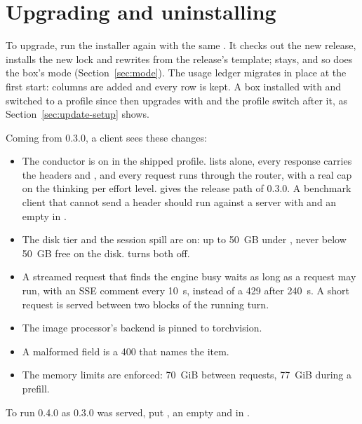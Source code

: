 \section{Upgrading and uninstalling}

To upgrade, run the installer again with the same . It checks out the new release, installs the new lock and rewrites  from the release's template;  stays, and so does the box's mode (Section~\ref{sec:mode}). The usage ledger migrates in place at the first start: columns are added and every row is kept. A box installed with  and switched to a profile since then upgrades with  and the profile switch after it, as Section~\ref{sec:update-setup} shows.

Coming from 0.3.0, a client sees these changes:

\begin{itemize}
\item The conductor is on in the shipped profile.  lists  alone, every response carries the headers  and , and every request runs through the router, with a real cap on the thinking per effort level.  gives the release path of 0.3.0. A benchmark client that cannot send a header should run against a server with  and an empty  in .
\item The disk tier and the session spill are on: up to 50~GB under , never below 50~GB free on the disk.  turns both off.
\item A streamed request that finds the engine busy waits as long as a request may run, with an SSE comment every 10~s, instead of a 429 after 240~s. A short request is served between two blocks of the running turn.
\item The image processor's backend is pinned to torchvision.
\item A malformed  field is a 400 that names the item.
\item The memory limits are enforced: 70~GiB between requests, 77~GiB during a prefill.
\end{itemize}

To run 0.4.0 as 0.3.0 was served, put , an empty  and  in .

